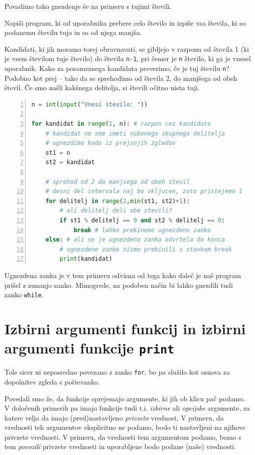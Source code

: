 Povadimo tako gnezdenje še na primeru s tujimi števili.
\begin{zgled}
Napiši program, ki od uporabnika prebere celo število in izpiše vsa števila, ki so podanemu številu tuja in so od njega manjša. 
\end{zgled}
\begin{resitev}
Kandidati, ki jih moramo torej obravnavati, se gibljejo v razponu od števila 1 (ki je vsem številom tuje število) do števila \texttt{n-1}, pri čemer je \texttt{n} število, ki ga je vnesel uporabnik. Kako za posameznega kandidata preverimo, če je tuj številu \texttt{n}? Podobno kot prej -- tako da se sprehodimo od števila 2, do manjšega od obeh števil. Če smo našli kakšnega delitelja, si števili očitno nista tuji.
\begin{lstlisting}[language=Python,numbers=left]
n = int(input("Vnesi stevilo: "))

for kandidat in range(1, n): # razpon cez kandidate
    # kandidat ne sme imeti nobenega skupnega delitelja
    # ugnezdimo kodo iz prejsnjih zgledov
    st1 = n
    st2 = kandidat
    
    # sprehod od 2 do manjsega od obeh stevil
    # desni del intervala naj bo vkljucen, zato pristejemo 1
    for delitelj in range(2,min(st1, st2)+1):
        # ali delitelj deli obe stevili?
        if st1 % delitelj == 0 and st2 % delitelj == 0:
            break # lahko prekinemo ugnezdeno zanko
    else: # ali se je ugnezdena zanka odvrtela do konca
        # ugnezdene zanke nismo prekinili s stavkom break
        print(kandidat)
\end{lstlisting}
\end{resitev}
Ugnezdena zanka je v tem primeru odvisna od tega kako daleč je naš program prišel z zunanjo zanko. Mimogrede, na podoben način bi lahko gnezdili tudi zanko \texttt{while}. 


\section{Izbirni argumenti funkcij in izbirni argumenti funkcije \texttt{print}}

Tole sicer ni neposredno povezano z zanko \texttt{for}, bo pa služilo kot osnova za dopolnitev zgleda s poštevanko. 

Povedali smo že, da funkcije sprejemajo argumente, ki jih ob klicu pač podamo. V določenih primerih pa imajo funkcije tudi t.i. \emph{izbirne} ali \emph{opcijske} argumente, za katere velja da imajo (pred)nastavljeno \emph{privzeto} vrednost. V primeru, da vrednosti teh argumentov eksplicitno ne podamo, bodo ti nastavljeni na njihove privzete vrednosti. V primeru, da vrednosti tem argumentom podamo, bomo s tem \emph{povozili} privzete vrednosti in uporabljene bodo podane (naše) vrednosti.

